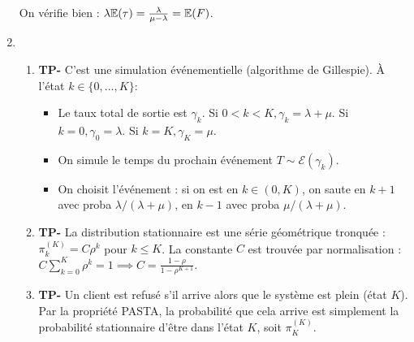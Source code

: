 \documentclass[]{exercices}
\begin{document}
\begin{solution}
\begin{enumerate}
    On vérifie bien : $\lambda \mathbb{E}(\tau) = \frac{\lambda}{\mu-\lambda} = \mathbb{E}(F)$.
    \item
    \begin{enumerate}
        \item \textbf{TP-} C'est une simulation événementielle (algorithme de Gillespie). À l'état $k \in \{0, \dots, K\}$:
        \begin{itemize}
            \item Le taux total de sortie est $\gamma_k$. Si $0<k<K, \gamma_k=\lambda+\mu$. Si $k=0, \gamma_0=\lambda$. Si $k=K, \gamma_K=\mu$.
            \item On simule le temps du prochain événement $T \sim \mathcal{E}(\gamma_k)$.
            \item On choisit l'événement : si on est en $k \in (0,K)$, on saute en $k+1$ avec proba $\lambda/(\lambda+\mu)$, en $k-1$ avec proba $\mu/(\lambda+\mu)$.
        \end{itemize}
        \item \textbf{TP-} La distribution stationnaire est une série géométrique tronquée : $\pi_k^{(K)} = C \rho^k$ pour $k \le K$. La constante $C$ est trouvée par normalisation : $C \sum_{k=0}^K \rho^k = 1 \implies C = \frac{1-\rho}{1-\rho^{K+1}}$.
        \item \textbf{TP-} Un client est refusé s'il arrive alors que le système est plein (état $K$). Par la propriété PASTA, la probabilité que cela arrive est simplement la probabilité stationnaire d'être dans l'état $K$, soit $\pi_K^{(K)}$.
    \end{enumerate}
\end{enumerate}
\end{solution}
\end{document}

